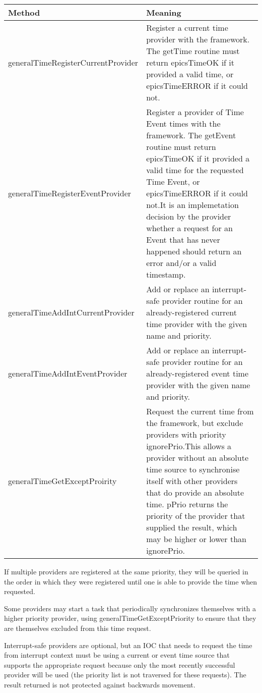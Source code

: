 \begin{center}\begin{longtable}{p{2.125in}p{4.625in}}
\textbf{Method} & \textbf{Meaning}\\
\hline
generalTimeRegisterCurrentProvider & Register a current time provider with the framework. The getTime routine must return epicsTimeOK if it provided a valid time, or epicsTimeERROR if it could not.\\
generalTimeRegisterEventProvider & Register a provider of Time Event times with the framework. The getEvent routine must return epicsTimeOK if it provided a valid time for the requested Time Event, or epicsTimeERROR if it could not.It is an implemetation decision by the provider whether a request for an Event that has never happened should return an error and/or a valid timestamp.\\
generalTimeAddIntCurrentProvider & Add or replace an interrupt-safe provider routine for an already-registered current time provider with the given name and priority.\\
generalTimeAddIntEventProvider & Add or replace an interrupt-safe provider routine for an already-registered event time provider with the given name and priority.\\
generalTimeGetExceptProirity & Request the current time from the framework, but exclude providers with priority ignorePrio.This allows a provider without an absolute time source to synchronise itself with other providers that do provide an absolute time.  pPrio returns the priority of the provider that supplied the result, which may be higher or lower than ignorePrio.
\end{longtable}\end{center}


If multiple providers are registered at the same priority, they will be queried in the order in which they were registered 
until one is able to provide the time when requested.

Some providers may start a task that periodically synchronizes themselves with a higher priority provider, using 
generalTimeGetExceptPriority to ensure that they are themselves excluded from this time request.

Interrupt-safe providers are optional, but an IOC that needs to request the time from interrupt context must be using a 
current or event time source that supports the appropriate request because only the most recently successful provider will 
be used (the priority list is not traversed for these requests). The result returned is not protected against backwards 
movement.

